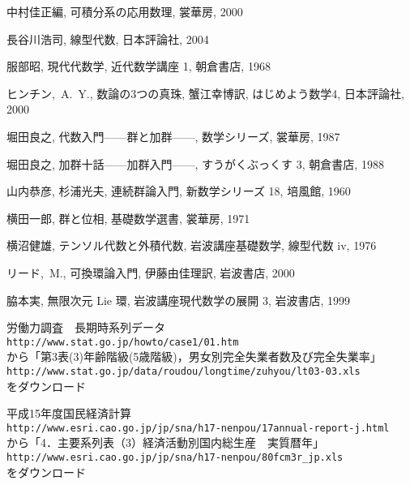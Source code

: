 \documentclass[12pt,twoside]{jarticle}
\begin{document}
\begin{thebibliography}{ABCD}
中村佳正編, 可積分系の応用数理, 裳華房, 2000

長谷川浩司, 線型代数, 日本評論社, 2004

服部昭, 現代代数学, 近代数学講座 1, 朝倉書店, 1968

ヒンチン,~A.~Y., 数論の3つの真珠, 蟹江幸博訳, はじめよう数学4, 日本評論社, 
2000

堀田良之, 代数入門——群と加群——, 数学シリーズ, 裳華房, 1987

堀田良之, 加群十話——加群入門——, すうがくぶっくす 3, 朝倉書店, 1988

山内恭彦, 杉浦光夫, 連続群論入門, 新数学シリーズ 18, 培風館, 1960

横田一郎, 群と位相, 基礎数学選書, 裳華房, 1971

横沼健雄, テンソル代数と外積代数, 岩波講座基礎数学, 線型代数 iv, 1976

リード,~M., 可換環論入門, 伊藤由佳理訳, 岩波書店, 2000

脇本実, 無限次元 Lie 環, 岩波講座現代数学の展開 3, 岩波書店, 1999

労働力調査　長期時系列データ \\
{\tt http://www.stat.go.jp/howto/case1/01.htm} \\
から「第3表(3)年齢階級(5歳階級)，男女別完全失業者数及び完全失業率」 \\
{\tt http://www.stat.go.jp/data/roudou/longtime/zuhyou/lt03-03.xls} \\
をダウンロード

平成15年度国民経済計算 \\
{\tt http://www.esri.cao.go.jp/jp/sna/h17-nenpou/17annual-report-j.html} \\
から「4．主要系列表（3）経済活動別国内総生産　実質暦年」\\
{\tt http://www.esri.cao.go.jp/jp/sna/h17-nenpou/80fcm3r\verb,_,jp.xls} \\
をダウンロード

\end{thebibliography}

\end{document}
